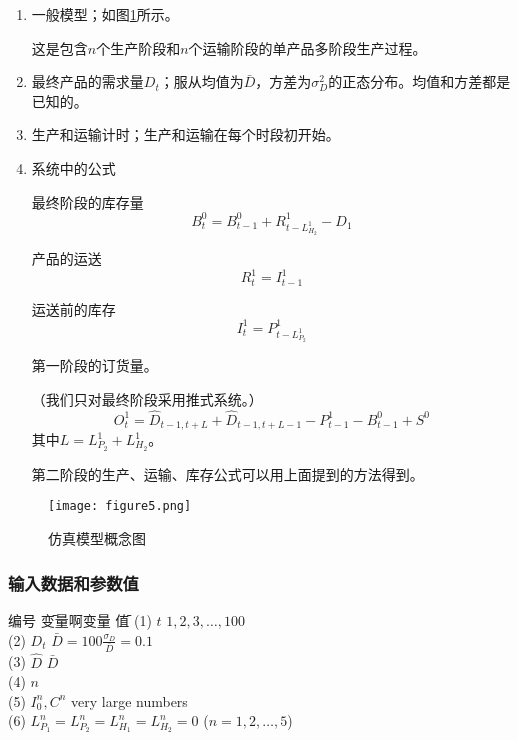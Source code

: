 \begin{enumerate}

\item
一般模型；如图\ref{fig:model}所示。

这是包含$n$个生产阶段和$n$个运输阶段的单产品多阶段生产过程。

\item
最终产品的需求量$D_t$；服从均值为$\bar{D}$，方差为$\sigma_D^2$的正态分布。均值和方差都是已知的。

\item
生产和运输计时；生产和运输在每个时段初开始。

\item
系统中的公式

最终阶段的库存量
\begin{equation}
B_t^0 = B_{t-1}^0 + R_{t-L_{H_2}^1}^1 - D_1
\label{eq:15}
\end{equation}

产品的运送
\begin{equation}
R_t^1 = I_{t-1}^1
\label{eq:16}
\end{equation}

运送前的库存
\begin{equation}
I_t^1 = P_{t-L_{P_2}^1}^1
\label{eq:17}
\end{equation}

第一阶段的订货量。

（我们只对最终阶段采用推式系统。）
\begin{equation}
O_t^1 = \hat{D}_{t-1,t+L} + \hat{D}_{t-1,t+L-1} - P_{t-1}^1 - B_{t-1}^0 + S^0
\label{eq:18}
\end{equation}
其中$L=L_{P_2}^1+L_{H_2}^1$。

第二阶段的生产、运输、库存公式可以用上面提到的方法得到。

\end{enumerate}

\begin{landscape}
\begin{figure}[p]
\centering
\texttt{[image: figure5.png]}
\caption{仿真模型概念图}
\label{fig:model}
\end{figure}
\end{landscape}

\subsubsection{输入数据和参数值}

\begin{tabbing}
编号 \= 变量啊变量 \= 值\kill
(1) \> $t$ \> $1,2,3,\ldots,100$ \\
(2) \> $D_t$ \> $\bar{D}=100\frac{\sigma_D}{\bar{D}}=0.1$ \\
(3) \> $\hat{D}$ \> $\bar{D}$ \\
(4) \> $n$  \\
(5) \> $I_0^n,C^n$ \> very large numbers \\
(6) \> $L_{P_1}^n=L_{P_2}^n=L_{H_1}^n=L_{H_2}^n=0$ ($n=1,2,\ldots,5$)
\end{tabbing}

